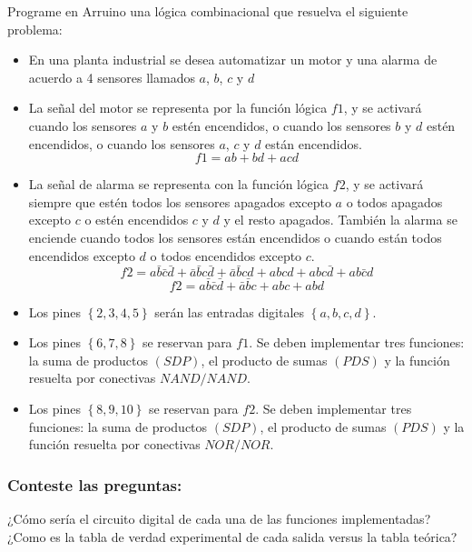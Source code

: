 Programe en Arruino una lógica combinacional que resuelva el siguiente problema:
\begin{itemize}
    \item En una planta industrial se desea automatizar un motor y una alarma de acuerdo a 4 sensores llamados $a$, $b$, $c$ y $d$ 
    \item La señal del motor se representa por la función lógica $f1$, y se activará  cuando los sensores $a$ y $b$ estén encendidos, o cuando los sensores $b$ y $d$ estén encendidos, o cuando los sensores $a$, $c$ y $d$ están encendidos.
    \begin{equation*}
        f1 = ab + bd + acd
    \end{equation*}
    \item La señal de  alarma se representa con la función lógica $f2$, y se activará siempre que estén todos los sensores apagados excepto $a$ o todos apagados excepto $c$ o estén encendidos $c$ y $d$ y el resto apagados. También la alarma se enciende cuando todos los sensores están encendidos o cuando están todos encendidos excepto $d$ o todos encendidos excepto $c$.
    \begin{equation*}
        f2 = a\bar{b}\bar{c}\bar{d} + \bar{a}\bar{b}c\bar{d} + \bar{a}\bar{b}cd + abcd + abc\bar{d} + ab\bar{c}d
    \end{equation*}
    \begin{equation*}
        f2 = a\bar{b}\bar{c}\bar{d} + \bar{a}\bar{b}c + abc + abd
    \end{equation*}
    \item Los pines $\left\lbrace 2,3,4,5\right\rbrace$ serán las entradas digitales $\left\lbrace a,b,c,d\right\rbrace$.
    \item Los pines $\left\lbrace 6,7,8\right\rbrace $ se reservan para $f1$. Se deben implementar tres funciones: la suma de productos $(SDP)$, el producto de sumas $(PDS)$ y la función resuelta por conectivas $NAND/NAND$. 
    \item Los pines $\left\lbrace 8,9,10\right\rbrace $ se reservan para $f2$. Se deben implementar tres funciones: la suma de productos $(SDP)$, el producto de sumas $(PDS)$ y la función resuelta por conectivas $NOR/NOR$.
\end{itemize}
 
\subsubsection{Conteste las preguntas:}

¿Cómo sería el circuito digital de cada una de las funciones implementadas?
¿Como es la tabla de verdad experimental de cada salida versus la tabla teórica?


